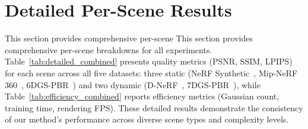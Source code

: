\documentclass{article}
\theoremstyle{plain}
\theoremstyle{definition}
\theoremstyle{remark}
\begin{document}
\section{Detailed Per-Scene Results}
\label{sec:detailed_results}

This section provides comprehensive per-scene This section provides comprehensive per-scene breakdowns for all experiments. Table~\ref{tab:detailed_combined} presents quality metrics (PSNR, SSIM, LPIPS) for each scene across all five datasets: three static (NeRF Synthetic~\cite{mildenhall2021nerf}, Mip-NeRF 360~\cite{barron2021mipnerf}, 6DGS-PBR~\cite{gao20246dgs}) and two dynamic (D-NeRF~\cite{pumarola2020dnerfneuralradiancefields}, 7DGS-PBR~\cite{gao20257dgs}), while Table~\ref{tab:efficiency_combined} reports efficiency metrics (Gaussian count, training time, rendering FPS). These detailed results demonstrate the consistency of our method's performance across diverse scene types and complexity levels.
\end{document}
